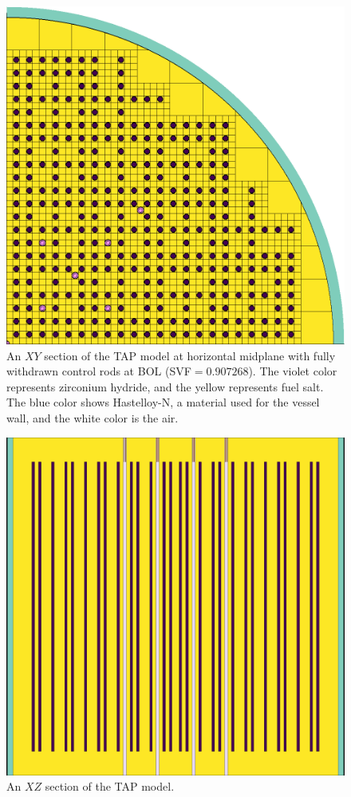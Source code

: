 \documentclass[12pt]{article} %
\begin{document}
\begin{figure}[htp!] %
  \centering
		  \includegraphics[width=\textwidth]{tap_plan_view.png}
  \caption{An $XY$ section of the \gls{TAP} model at horizontal midplane 
  with fully withdrawn control rods at \gls{BOL} (\gls{SVF}$=0.907268$). 
  The violet color represents zirconium 
hydride, and the yellow represents fuel salt. The blue color shows 
Hastelloy-N, a material used for the vessel wall, and the white color 
is the air.}
  \label{fig:tap-serpent-plan}
\end{figure}
\begin{figure}[htp!] %
  \centering
		  \includegraphics[width=\textwidth]{tap_elev_view.png}
		 \vspace{-0.35in}
  \caption{An $XZ$ section of the \gls{TAP} model.}
  \label{fig:tap-serpent-elev}
\end{figure}
\end{document}
